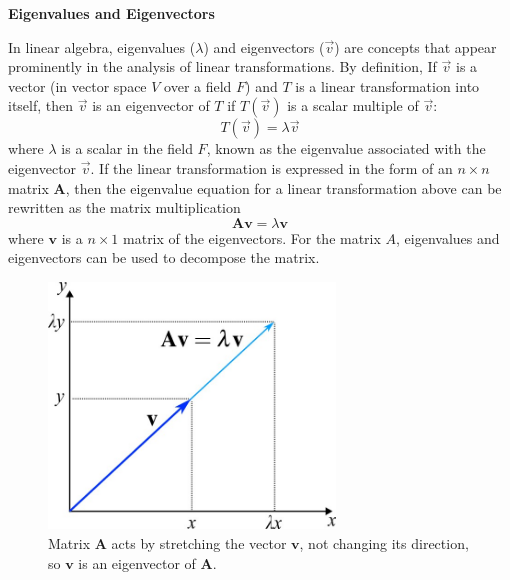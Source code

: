\documentclass[12pt,letter]{article}
\begin{document}
	

	

	

	\begin{review}
	
		\textbf{Eigenvalues and Eigenvectors}
	
		In linear algebra, eigenvalues ($\lambda$) and eigenvectors ($\vec{v}$) are concepts that appear prominently in the analysis of linear transformations. By definition, If  $\vec{v}$ is a vector (in vector space $V$ over a field $F$) and $T$ is a linear transformation into itself, then $\vec{v}$ is an eigenvector of $T$ if $T(\vec{v})$ is a scalar multiple of $\vec{v}$:
		\begin{equation}
		T(\vec{v}) = \lambda\vec{v}
		\end{equation}
		where $\lambda$ is a scalar in the field $F$, known as the eigenvalue associated with the eigenvector $\vec{v}$. If the linear transformation is expressed in the form of an $n \times n$ matrix $\textbf{A}$, then the eigenvalue equation for a linear transformation above can be rewritten as the matrix multiplication
		\begin{equation}
		\textbf{A}\textbf{v} = \lambda\textbf{v}
		\end{equation}
		where $\textbf{v}$ is a $n \times 1$ matrix of the eigenvectors. For the matrix $A$, eigenvalues and eigenvectors can be used to decompose the matrix.

		\begin{figure}[H]
			\centering
			\includegraphics[width=3in]{../figures/eigenvalues_2}
			\caption{Matrix $\textbf{A}$ acts by stretching the vector $\textbf{v}$, not changing its direction, so $\textbf{v}$ is an eigenvector of $\textbf{A}$.}
			\label{fig:eigenvalues}
		\end{figure}
		
			
	

\end{review}
\end{document}
